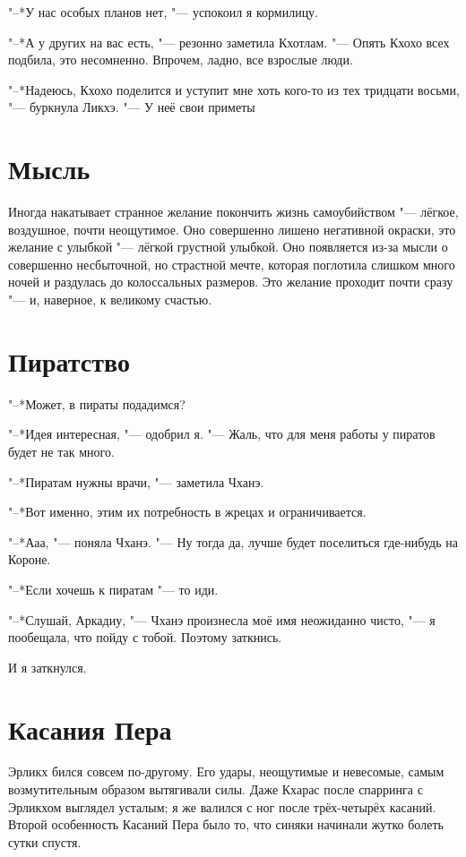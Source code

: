 "--*У нас особых планов нет, "--- успокоил я кормилицу.

"--*А у других на вас есть, "--- резонно заметила Кхотлам.
"--- Опять Кхохо всех подбила, это несомненно.
Впрочем, ладно, все взрослые люди.

"--*Надеюсь, Кхохо поделится и уступит мне хоть кого-то из тех тридцати восьми, "--- буркнула Ликхэ.
"--- У неё свои приметы\ldotst

\section{Мысль}

Иногда накатывает странное желание покончить жизнь самоубийством "--- лёгкое, воздушное, почти неощутимое.
Оно совершенно лишено негативной окраски, это желание с улыбкой "--- лёгкой грустной улыбкой.
Оно появляется из-за мысли о совершенно несбыточной, но страстной мечте, которая поглотила слишком много ночей и раздулась до колоссальных размеров.
Это желание проходит почти сразу "--- и, наверное, к великому счастью.

\section{Пиратство}

"--*Может, в пираты подадимся?

"--*Идея интересная, "--- одобрил я.
"--- Жаль, что для меня работы у пиратов будет не так много.

"--*Пиратам нужны врачи, "--- заметила Чханэ.

"--*Вот именно, этим их потребность в жрецах и ограничивается.

"--*Ааа, "--- поняла Чханэ.
"--- Ну тогда да, лучше будет поселиться где-нибудь на Короне.

"--*Если хочешь к пиратам "--- то иди.

"--*Слушай, Аркадиу, "--- Чханэ произнесла моё имя неожиданно чисто, "--- я пообещала, что пойду с тобой.
Поэтому заткнись.

И я заткнулся.

\section{Касания Пера}

Эрликх бился совсем по-другому.
Его удары, неощутимые и невесомые, самым возмутительным образом вытягивали силы.
Даже Кхарас после спарринга с Эрликхом выглядел усталым;
я же валился с ног после трёх-четырёх касаний.
Второй особенность Касаний Пера было то, что синяки начинали жутко болеть сутки спустя.

